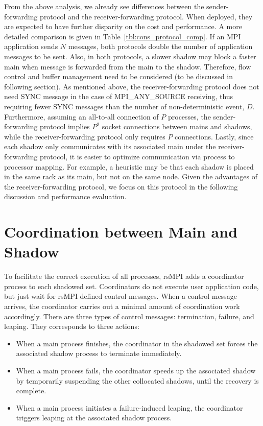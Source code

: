 From the above analysis, we already see differences between the sender-forwarding protocol and the receiver-forwarding protocol. When deployed, they are expected to have further disparity on the cost and performance. 
A more detailed comparison is given in Table~\ref{tbl:cons_protocol_comp}. If an MPI application sends $N$ messages, both protocols double the number of application messages to be sent. Also, in both protocols, a slower shadow may block a faster main when message is forwarded from the main to the shadow. Therefore, flow control and buffer management need to be considered (to be discussed in following section). As mentioned above, the receiver-forwarding protocol does not need SYNC message in the case of MPI\_ANY\_SOURCE receiving, thus requiring fewer SYNC messages than the number of non-deterministic event, $D$. Furthermore, assuming an all-to-all connection of $P$ processes, the sender-forwarding protocol implies $P^2$ socket connections between mains and shadows, while the receiver-forwarding protocol only requires $P$ connections. Lastly, since each shadow only communicates with its associated main under the receiver-forwarding protocol, it is easier to optimize communication via process to processor mapping. For example, a heuristic may be that each shadow is placed in the same rack as its main, but not on the same node. Given the advantages of the receiver-forwarding protocol, we focus on this protocol in the following discussion and performance evaluation.



\section{Coordination between Main and Shadow}
To facilitate the correct execution of all processes, rsMPI adds a coordinator process to each shadowed set. 
Coordinators do not execute user application code, but just wait for rsMPI defined control messages. When a control message arrives, the coordinator carries out a minimal amount of coordination work accordingly. There are three types of control messages: termination, failure, and leaping. They corresponds to three actions:
\begin{itemize}
  \item When a main process finishes, the coordinator in the shadowed set forces the associated shadow process to terminate immediately.
  \item When a main process fails, the coordinator speeds up the associated shadow by temporarily suspending the other collocated shadows, until the recovery is complete.
  \item When a main process initiates a failure-induced leaping, the coordinator triggers leaping at the associated shadow process.
\end{itemize}


